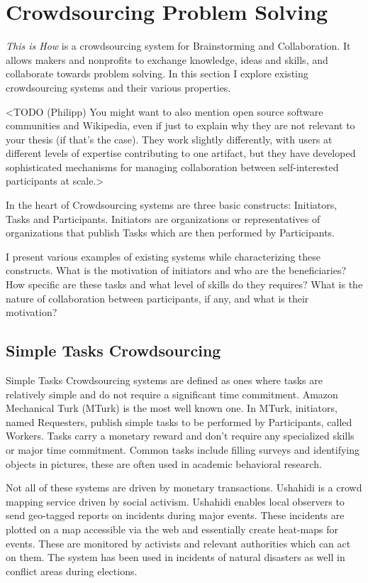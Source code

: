 \section{Crowdsourcing Problem Solving}

\textit{This is How} is a crowdsourcing system for Brainstorming and Collaboration. It allows makers and nonprofits to exchange knowledge, ideas and skills, and collaborate towards problem solving. In this section I explore existing crowdsourcing systems and their various properties.

<TODO (Philipp) You might want to also mention open source software communities and Wikipedia, even if just to explain why they are not relevant to your thesis (if that’s the case). They work slightly differently, with users at different levels of expertise contributing to one artifact, but they have developed sophisticated mechanisms for managing collaboration between self-interested participants at scale.>

In the heart of Crowdsourcing systems are three basic constructs: Initiators, Tasks and Participants. Initiators are organizations or representatives of organizations that publish Tasks which are then performed by Participants. 

I present various examples of existing systems while characterizing these constructs. What is the motivation of initiators and who are the beneficiaries? How specific are these tasks and what level of skills do they requires? What is the nature of collaboration between participants, if any, and what is their motivation?

\subsection{Simple Tasks Crowdsourcing}

Simple Tasks Crowdsourcing systems are defined as ones where tasks are relatively simple and do not require a significant time commitment. Amazon Mechanical Turk (MTurk) \cite{mturk} is the most well known one. In MTurk, initiators, named Requesters, publish simple tasks to be performed by Participants, called Workers. Tasks carry a monetary reward and don't require any specialized skills or major time commitment. Common tasks include filling surveys and  identifying objects in pictures, these are often used in academic behavioral research.  

Not all of these systems are driven by monetary transactions. Ushahidi\cite{ushahidi} is a crowd mapping service driven by social activism. Ushahidi enables local observers to send geo-tagged reports on incidents during major events. These incidents are plotted on a map accessible via the web and essentially create heat-maps for events. These are monitored by activists and relevant authorities which can act on them. The system has been used in incidents of natural disasters as well in conflict areas during elections. 

